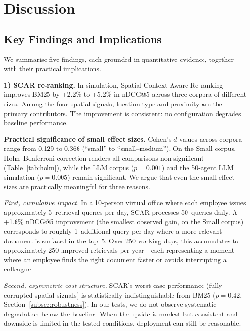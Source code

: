 \documentclass[journal]{IEEEtran}
\begin{document}
\section{Discussion}
\label{sec:discussion}

\subsection{Key Findings and Implications}
\label{subsec:contributions}

We summarise five findings, each grounded in quantitative evidence, together with their practical implications.

\textbf{1) SCAR re-ranking.}
In simulation, Spatial Context-Aware Re-ranking improves BM25 by +2.2\% to +5.2\% in nDCG@5 across three corpora of different sizes.
Among the four spatial signals, location type and proximity are the primary contributors.
The improvement is consistent: no configuration degrades baseline performance.

\textbf{Practical significance of small effect sizes.}
Cohen's $d$ values across corpora range from 0.129 to 0.366 (``small'' to ``small--medium'').  On the Small corpus, Holm--Bonferroni correction renders all comparisons non-significant (Table~\ref{tab:holm}), while the LLM corpus ($p = 0.001$) and the 50-agent LLM simulation ($p = 0.005$) remain significant.  We argue that even the small effect sizes are practically meaningful for three reasons.

\emph{First, cumulative impact.}  In a 10-person virtual office where each employee issues approximately 5~retrieval queries per day, SCAR processes 50~queries daily.  A +1.6\% nDCG@5 improvement (the smallest observed gain, on the Small corpus) corresponds to roughly 1~additional query per day where a more relevant document is surfaced in the top~5.  Over 250 working days, this accumulates to approximately 250 improved retrievals per year---each representing a moment where an employee finds the right document faster or avoids interrupting a colleague.

\emph{Second, asymmetric cost structure.}  SCAR's worst-case performance (fully corrupted spatial signals) is statistically indistinguishable from BM25 ($p = 0.42$, Section~\ref{subsec:robustness}).  In our tests, we do not observe systematic degradation below the baseline.  When the upside is modest but consistent and downside is limited in the tested conditions, deployment can still be reasonable.
\end{document}
